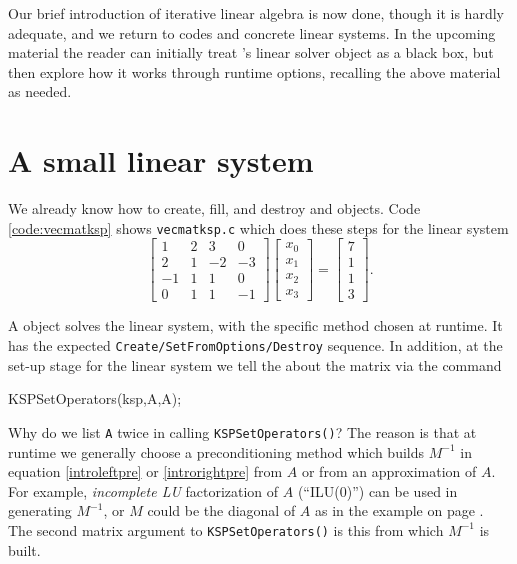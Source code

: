 Our brief introduction of iterative linear algebra is now done, though it is hardly adequate, and we return to \PETSc codes and concrete linear systems.  In the upcoming material the reader can initially treat \PETSc's \pKSP linear solver object as a black box, but then explore how it works through runtime options, recalling the above material as needed.


\section{A small linear system}

We already know how to create, fill, and destroy \pVec and \pMat objects.  Code \ref{code:vecmatksp} shows \texttt{vecmatksp.c} which does these steps for the linear system
\begin{equation}
\begin{bmatrix} 1 & 2 & 3 & 0 \\
                2 & 1 &-2 &-3 \\
               -1 & 1 & 1 & 0 \\
                0 & 1 & 1 &-1 \end{bmatrix}
\begin{bmatrix} x_0 \\ x_1 \\ x_2 \\ x_3 \end{bmatrix}
=
\begin{bmatrix} 7 \\ 1 \\ 1 \\ 3 \end{bmatrix}.
\end{equation}

A \pKSP object solves the linear system, with the specific method chosen at runtime.  It has the expected \texttt{Create/SetFromOptions/Destroy} sequence.  In addition, at the set-up stage for the linear system we tell the \pKSP about the matrix via the command
\begin{code}
KSPSetOperators(ksp,A,A);
\end{code}
Why do we list \texttt{A} twice in calling \texttt{KSPSetOperators()}?  The reason is that at runtime we generally choose a preconditioning method which builds $M^{-1}$ in equation \eqref{introleftpre} or \eqref{introrightpre} from $A$ or from an approximation of $A$.  For example, \emph{incomplete LU} factorization of $A$ (``ILU($0$)'') can be used in generating $M^{-1}$, or $M$ could be the diagonal of $A$ as in the example on page \pageref{example:ls:jacobirichardson}.  The second matrix argument to \texttt{KSPSetOperators()} is this \pMat from which $M^{-1}$ is built.

